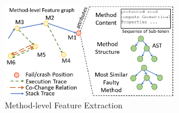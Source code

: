   \begin{figure}[t]
	\centering
	\includegraphics[width=3in]{graphs/step-1-method.png}
        \vspace{-6pt}
        \caption{Method-level Feature Extraction}
	\label{method-level-feature-extraction}
\end{figure}


